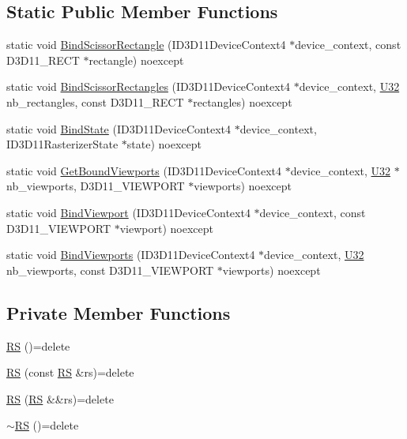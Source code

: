 \subsection*{Static Public Member Functions}
\begin{DoxyCompactItemize}
\item 
static void \hyperlink{structmage_1_1_pipeline_1_1_r_s_a2752b80ae52f33dae7c42b48b4481ec9}{Bind\+Scissor\+Rectangle} (I\+D3\+D11\+Device\+Context4 $\ast$device\+\_\+context, const D3\+D11\+\_\+\+R\+E\+CT $\ast$rectangle) noexcept
\item 
static void \hyperlink{structmage_1_1_pipeline_1_1_r_s_a11ee6c76dd0c05eecc0f09df7dc61068}{Bind\+Scissor\+Rectangles} (I\+D3\+D11\+Device\+Context4 $\ast$device\+\_\+context, \hyperlink{namespacemage_a41c104c036fba3756a74e19f793eeaa1}{U32} nb\+\_\+rectangles, const D3\+D11\+\_\+\+R\+E\+CT $\ast$rectangles) noexcept
\item 
static void \hyperlink{structmage_1_1_pipeline_1_1_r_s_a247899ff60b64d61f240b89312904c91}{Bind\+State} (I\+D3\+D11\+Device\+Context4 $\ast$device\+\_\+context, I\+D3\+D11\+Rasterizer\+State $\ast$state) noexcept
\item 
static void \hyperlink{structmage_1_1_pipeline_1_1_r_s_ab807c959aa17ed7db5b7158502551da0}{Get\+Bound\+Viewports} (I\+D3\+D11\+Device\+Context4 $\ast$device\+\_\+context, \hyperlink{namespacemage_a41c104c036fba3756a74e19f793eeaa1}{U32} $\ast$nb\+\_\+viewports, D3\+D11\+\_\+\+V\+I\+E\+W\+P\+O\+RT $\ast$viewports) noexcept
\item 
static void \hyperlink{structmage_1_1_pipeline_1_1_r_s_aacab4adaa1314bd95fb6197fbfa728a9}{Bind\+Viewport} (I\+D3\+D11\+Device\+Context4 $\ast$device\+\_\+context, const D3\+D11\+\_\+\+V\+I\+E\+W\+P\+O\+RT $\ast$viewport) noexcept
\item 
static void \hyperlink{structmage_1_1_pipeline_1_1_r_s_ab3bc6bbb80b4e74a07a9c041253adbf9}{Bind\+Viewports} (I\+D3\+D11\+Device\+Context4 $\ast$device\+\_\+context, \hyperlink{namespacemage_a41c104c036fba3756a74e19f793eeaa1}{U32} nb\+\_\+viewports, const D3\+D11\+\_\+\+V\+I\+E\+W\+P\+O\+RT $\ast$viewports) noexcept
\end{DoxyCompactItemize}
\subsection*{Private Member Functions}
\begin{DoxyCompactItemize}
\item 
\hyperlink{structmage_1_1_pipeline_1_1_r_s_a5d2920325973d503fee6137b45835503}{RS} ()=delete
\item 
\hyperlink{structmage_1_1_pipeline_1_1_r_s_a264dbb8473ad4a286112aa525e2a3018}{RS} (const \hyperlink{structmage_1_1_pipeline_1_1_r_s}{RS} \&rs)=delete
\item 
\hyperlink{structmage_1_1_pipeline_1_1_r_s_a5aca2e871b4a7133bb49b98f28a2ef9e}{RS} (\hyperlink{structmage_1_1_pipeline_1_1_r_s}{RS} \&\&rs)=delete
\item 
\hyperlink{structmage_1_1_pipeline_1_1_r_s_a3a6900db36fe13ce2ddd6375314d5bc6}{$\sim$\+RS} ()=delete
\end{DoxyCompactItemize}


